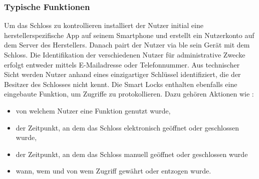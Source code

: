     \subsubsection{Typische Funktionen}
    \label{sec:sota_smart_locks_func}
		Um das Schloss zu kontrollieren installiert der Nutzer initial eine herstellerspezifische App auf seinem Smartphone und erstellt ein Nutzerkonto auf dem Server des Herstellers. 
		Danach pairt der Nutzer via \gls{ble} sein Gerät mit dem Schloss.\cite{Ho2016} 
		Die Identifikation der verschiedenen Nutzer für administrative Zwecke erfolgt entweder mittels E-Mailadresse oder Telefonnummer. 
		Aus technischer Sicht werden Nutzer anhand eines einzigartiger Schlüssel identifiziert, die der Besitzer des Schlosses nicht kennt.\cite{Fuller2017}
		Die Smart Locks enthalten ebenfalls eine eingebaute Funktion, um Zugriffe zu protokollieren. 
		Dazu gehören Aktionen wie \cite{Fuller2017}:
		\begin{itemize}[noitemsep]
			\item von welchem Nutzer eine Funktion genutzt wurde, 
			\item der Zeitpunkt, an dem das Schloss elektronisch geöffnet oder geschlossen wurde,
			\item der Zeitpunkt, an dem das Schloss manuell geöffnet oder geschlossen wurde
			\item wann, wem und von wem Zugriff gewährt oder entzogen wurde.
		\end{itemize}
	
